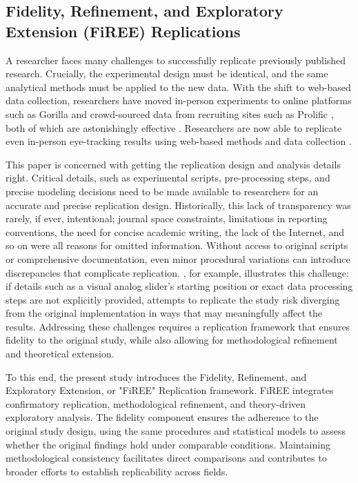 \subsection{Fidelity, Refinement, and Exploratory Extension (FiREE) Replications}

A researcher faces many challenges to successfully replicate previously published research. Crucially, the experimental design must be identical, and the same analytical methods must be applied to the new data. With the shift to web-based data collection, researchers have moved in-person experiments to online platforms such as Gorilla \citep{Anwyl-Irvine_2019} and crowd-sourced data from recruiting sites such as Prolific \citep{douglas2023data}, both of which are astonishingly effective \citep{tomczak2023over, eerola2021online}. Researchers are now able to replicate even in-person eye-tracking results using web-based methods and data collection \citep[see ][] {semmelmann2018online, Vos_2022, Prystauka_Altmann_Rothman_2023}. 

This paper is concerned with getting the replication design and analysis details right. Critical details, such as experimental scripts, pre-processing steps, and precise modeling decisions need to be made available to researchers for an accurate and precise replication design. Historically, this lack of transparency was rarely, if ever, intentional; journal space constraints, limitations in reporting conventions, the need for concise academic writing, the lack of the Internet, and so on were all reasons for omitted information. Without access to original scripts or comprehensive documentation, even minor procedural variations can introduce discrepancies that complicate replication. \cite{AOW}, for example, illustrates this challenge: if details such as a visual analog slider's starting position or exact data processing steps are not explicitly provided, attempts to replicate the study risk diverging from the original implementation in ways that may meaningfully affect the results. Addressing these challenges requires a replication framework that ensures fidelity to the original study, while also allowing for methodological refinement and theoretical extension.

To this end, the present study introduces the Fidelity, Refinement, and Exploratory Extension, or "FiREE" Replication framework. FiREE integrates confirmatory replication, methodological refinement, and theory-driven exploratory analysis. The fidelity component ensures the adherence to the original study design, using the same procedures and statistical models to assess whether the original findings hold under comparable conditions. Maintaining methodological consistency facilitates direct comparisons and contributes to broader efforts to establish replicability across fields. 

